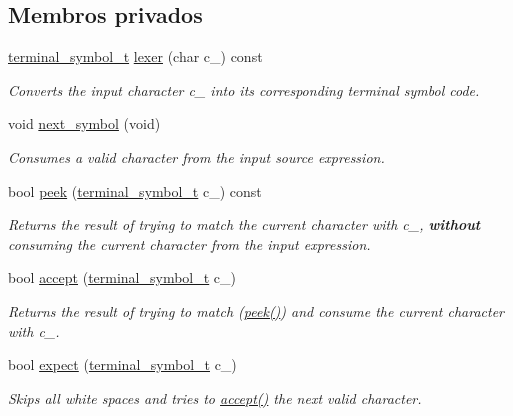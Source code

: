 \subsection*{Membros privados}
\begin{DoxyCompactItemize}
\item 
\hyperlink{classParser_a7d49b050a3c0df9e37ff81c5099be049}{terminal\+\_\+symbol\+\_\+t} \hyperlink{classParser_aa2bbaa87534abef84269d79cf7165035}{lexer} (char c\+\_\+) const
\begin{DoxyCompactList}\small\item\em Converts the input character c\+\_\+ into its corresponding terminal symbol code. \end{DoxyCompactList}\item 
void \hyperlink{classParser_ac0919453374e9abfb0f55f41f057d7a1}{next\+\_\+symbol} (void)
\begin{DoxyCompactList}\small\item\em Consumes a valid character from the input source expression. \end{DoxyCompactList}\item 
bool \hyperlink{classParser_a38df5f6fc75d85cc6907ae21e11c5b16}{peek} (\hyperlink{classParser_a7d49b050a3c0df9e37ff81c5099be049}{terminal\+\_\+symbol\+\_\+t} c\+\_\+) const
\begin{DoxyCompactList}\small\item\em Returns the result of trying to match the current character with c\+\_\+, {\bfseries without} consuming the current character from the input expression. \end{DoxyCompactList}\item 
bool \hyperlink{classParser_a884775e075317b4b2cfb2016d3654f2a}{accept} (\hyperlink{classParser_a7d49b050a3c0df9e37ff81c5099be049}{terminal\+\_\+symbol\+\_\+t} c\+\_\+)
\begin{DoxyCompactList}\small\item\em Returns the result of trying to match (\hyperlink{classParser_a38df5f6fc75d85cc6907ae21e11c5b16}{peek()}) and consume the current character with c\+\_\+. \end{DoxyCompactList}\item 
bool \hyperlink{classParser_ac107d6116db968131021f4e57838b27d}{expect} (\hyperlink{classParser_a7d49b050a3c0df9e37ff81c5099be049}{terminal\+\_\+symbol\+\_\+t} c\+\_\+)
\begin{DoxyCompactList}\small\item\em Skips all white spaces and tries to \hyperlink{classParser_a884775e075317b4b2cfb2016d3654f2a}{accept()} the next valid character. \end{DoxyCompactList}\item 

\end{DoxyCompactItemize}
